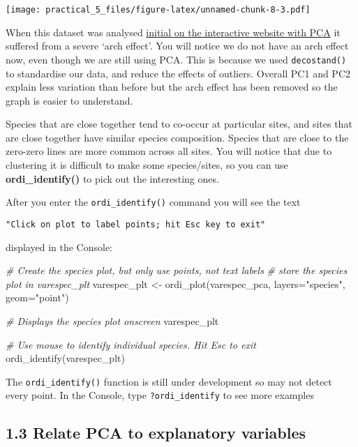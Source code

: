\documentclass[
]{article}
\newenvironment{Shaded}{\begin{snugshade}}{\end{snugshade}}
\newcommand{\AttributeTok}[1]{\textcolor[rgb]{0.77,0.63,0.00}{#1}}
\newcommand{\CommentTok}[1]{\textcolor[rgb]{0.56,0.35,0.01}{\textit{#1}}}
\newcommand{\FunctionTok}[1]{\textcolor[rgb]{0.00,0.00,0.00}{#1}}
\newcommand{\NormalTok}[1]{#1}
\newcommand{\OtherTok}[1]{\textcolor[rgb]{0.56,0.35,0.01}{#1}}
\newcommand{\StringTok}[1]{\textcolor[rgb]{0.31,0.60,0.02}{#1}}
\begin{document}
\texttt{[image: practical\_5\_files/figure-latex/unnamed-chunk-8-3.pdf]}

When this dataset was analysed
\href{https://naturalandenvironmentalscience.shinyapps.io/Unconstrained/\#section-ca-and-nmds}{initial
on the interactive website with PCA} it suffered from a severe `arch
effect'. You will notice we do not have an arch effect now, even though
we are still using PCA. This is because we used \texttt{decostand()} to
standardise our data, and reduce the effects of outliers. Overall PC1
and PC2 explain less variation than before but the arch effect has been
removed so the graph is easier to understand.

Species that are close together tend to co-occur at particular sites,
and sites that are close together have similar species composition.
Species that are close to the zero-zero lines are more common across all
sites. You will notice that due to clustering it is difficult to make
some species/sites, so you can use \textbf{ordi\_identify()} to pick out
the interesting ones.

After you enter the \texttt{ordi\_identify()} command you will see the
text

\texttt{"Click\ on\ plot\ to\ label\ points;\ hit\ Esc\ key\ to\ exit"}

displayed in the Console:

\begin{Shaded}
\begin{Highlighting}[]
\CommentTok{\# Create the species plot, but only use points, not text labels}
\CommentTok{\# store the species plot in varespec\_plt}
\NormalTok{varespec\_plt }\OtherTok{\textless{}{-}} \FunctionTok{ordi\_plot}\NormalTok{(varespec\_pca, }\AttributeTok{layers=}\StringTok{"species"}\NormalTok{, }\AttributeTok{geom=}\StringTok{"point"}\NormalTok{)}

\CommentTok{\# Displays the species plot onscreen}
\NormalTok{varespec\_plt}

\CommentTok{\# Use mouse to identify individual species. Hit Esc to exit}
\FunctionTok{ordi\_identify}\NormalTok{(varespec\_plt)}
\end{Highlighting}
\end{Shaded}

The \texttt{ordi\_identify()} function is still under development so may
not detect every point. In the Console, type \texttt{?ordi\_identify} to
see more examples

\hypertarget{relate-pca-to-explanatory-variables}{%
\subsection{1.3 Relate PCA to explanatory
variables}\label{relate-pca-to-explanatory-variables}}
\end{document}
